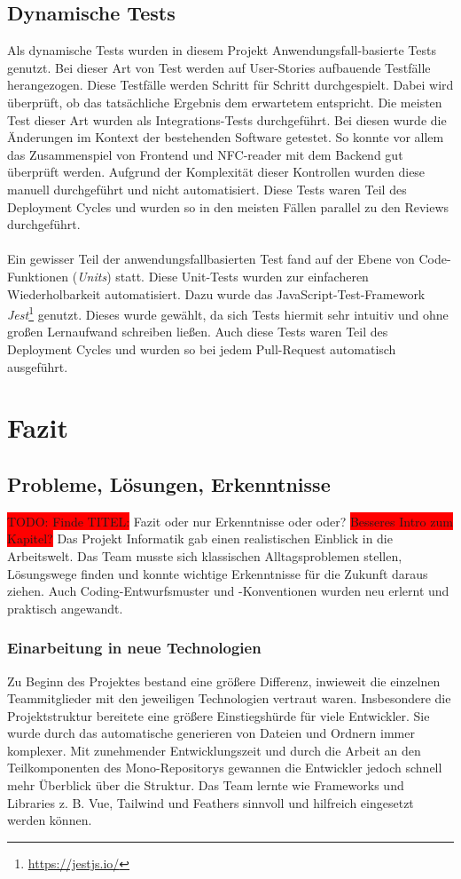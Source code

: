\documentclass[10pt, a4paper]{article}
\begin{document}
\subsection{Dynamische Tests}
Als dynamische Tests wurden in diesem Projekt Anwendungsfall-basierte Tests genutzt.
Bei dieser Art von Test werden auf User-Stories aufbauende Testfälle herangezogen.
Diese Testfälle werden Schritt für Schritt \glqq durchgespielt\grqq.
Dabei wird überprüft, ob das tatsächliche Ergebnis dem erwartetem entspricht.
Die meisten Test  dieser Art wurden als Integrations-Tests durchgeführt.
Bei diesen wurde die Änderungen im Kontext der bestehenden Software getestet.
So konnte vor allem das Zusammenspiel von Frontend und NFC-reader mit dem Backend gut überprüft werden.
Aufgrund der Komplexität dieser Kontrollen wurden diese manuell durchgeführt und nicht automatisiert.
Diese Tests waren Teil des Deployment Cycles und wurden so in den meisten Fällen parallel zu den Reviews durchgeführt.
\\~\\
Ein gewisser Teil der anwendungsfallbasierten Test fand auf der Ebene von Code-Funktionen (\textit{Units}) statt.
Diese Unit-Tests wurden zur einfacheren Wiederholbarkeit automatisiert.
Dazu wurde das JavaScript-Test-Framework \textit{Jest}\footnote{\raggedright\url{https://jestjs.io/}} genutzt.
Dieses wurde gewählt, da sich Tests hiermit sehr intuitiv und ohne großen Lernaufwand schreiben ließen.
Auch diese Tests waren Teil des Deployment Cycles und wurden so bei jedem Pull-Request automatisch ausgeführt.



\section{Fazit}
\subsection{Probleme, Lösungen, Erkenntnisse}
\colorbox{red}{TODO: Finde TITEL:} Fazit oder nur Erkenntnisse oder oder?
\colorbox{red}{Besseres Intro zum Kapitel?}
Das Projekt Informatik gab einen realistischen Einblick in die Arbeitswelt.
Das Team musste sich klassischen Alltagsproblemen stellen, Lösungswege finden und konnte wichtige Erkenntnisse für die Zukunft daraus ziehen.
Auch Coding-Entwurfsmuster und -Konventionen wurden neu erlernt und praktisch angewandt.

\subsubsection{Einarbeitung in neue Technologien}
Zu Beginn des Projektes bestand eine größere Differenz, inwieweit die einzelnen Teammitglieder mit den jeweiligen Technologien vertraut waren.
Insbesondere die Projektstruktur bereitete eine größere Einstiegshürde für viele Entwickler.
Sie wurde durch das automatische generieren von Dateien und Ordnern immer komplexer.
Mit zunehmender Entwicklungszeit und durch die Arbeit an den Teilkomponenten des Mono-Repositorys gewannen die Entwickler jedoch schnell mehr Überblick über die Struktur.
Das Team lernte wie Frameworks und Libraries  z. B. Vue, Tailwind und Feathers sinnvoll und hilfreich eingesetzt werden können.
\end{document}
